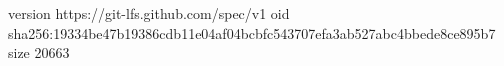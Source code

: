 version https://git-lfs.github.com/spec/v1
oid sha256:19334be47b19386cdb11e04af04bcbfc543707efa3ab527abc4bbede8ce895b7
size 20663
